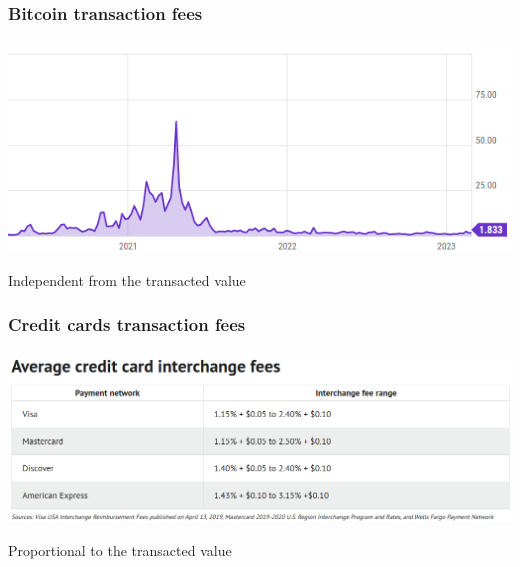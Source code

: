 \documentclass[11pt]{beamer}  %
\begin{document}
\begin{frame}\frametitle{Bitcoin transaction fees}

  \begin{center}
    \includegraphics[width=\textwidth,clip=false]{pictures/bitcoin-fees.png}
  \end{center}

  \begin{center}
    Independent from the transacted value
  \end{center}

\end{frame}

\begin{frame}\frametitle{Credit cards transaction fees}

  \begin{center}
    \includegraphics[width=\textwidth,clip=false]{pictures/credit-cards-fees.png}
  \end{center}

  \begin{center}
    Proportional to the transacted value
  \end{center}

\end{frame}
\end{document}
